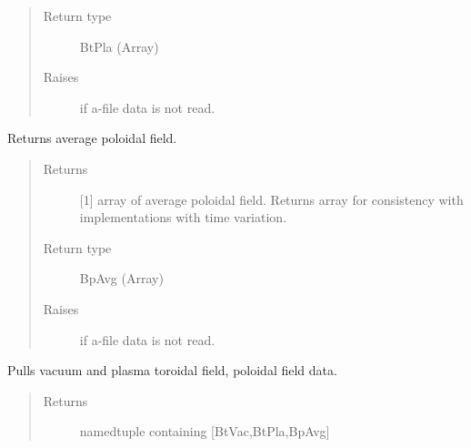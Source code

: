 \documentclass[letterpaper,10pt,english]{sphinxmanual}
\begin{document}
\begin{fulllineitems}
\begin{fulllineitems}
\begin{quote}
\begin{description}
\item[{Return type}] \leavevmode
BtPla (Array)

\item[{Raises}] \leavevmode
{} \textendash{} if a-file data is not read.

\end{description}\end{quote}

\end{fulllineitems}


\begin{fulllineitems}
\label{\detokenize{eqtools:eqtools.eqdskreader.EqdskReader.getBpAvg}}
Returns average poloidal field.
\begin{quote}\begin{description}
\item[{Returns}] \leavevmode
{[}1{]} array of average poloidal field.  Returns array
for consistency with
{\hyperref[\detokenize{eqtools:eqtools.core.Equilibrium}]{}}
implementations with time variation.

\item[{Return type}] \leavevmode
BpAvg (Array)

\item[{Raises}] \leavevmode
{} \textendash{} if a-file data is not read.

\end{description}\end{quote}

\end{fulllineitems}


\begin{fulllineitems}
\label{\detokenize{eqtools:eqtools.eqdskreader.EqdskReader.getFields}}
Pulls vacuum and plasma toroidal field, poloidal field data.
\begin{quote}\begin{description}
\item[{Returns}] \leavevmode
namedtuple containing {[}BtVac,BtPla,BpAvg{]}


\end{description}
\end{quote}
\end{fulllineitems}
\end{fulllineitems}
\end{document}
